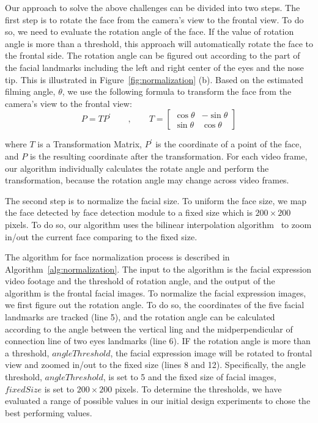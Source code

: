             Our approach to solve the above challenges can be divided into two steps. The first step is to rotate the face from the camera's view to the frontal view. To do so, we need to evaluate the rotation angle of the face. If the value of rotation angle is more than a threshold, this approach will automatically rotate the face to the frontal side. The rotation angle can be figured out according to the part of the facial landmarks including the left and right center of the eyes and the nose tip. This is illustrated in Figure~\ref{fig:normalization} (b). Based on the estimated filming angle, $\theta$, we use the following formula to transform the face from the camera's view to the frontal view:
            \begin{equation}
                P=TP^{'} \qquad, \qquad  T=\left[ \begin{matrix} \cos\theta & -\sin\theta \\ \sin\theta & \cos\theta \end{matrix} \right]
            \end{equation}

            where $T$ is a Transformation Matrix, $P^{'}$ is the coordinate of a point of the face, and $P$ is the resulting coordinate after the transformation. For each video frame, our algorithm individually calculates the rotate angle and perform the transformation, because the rotation angle may change across video frames.

            The second step is to normalize the facial size. To uniform the face size, we map the face detected by face detection module to a fixed size which is $200\times200$ pixels. To do so, our algorithm uses the bilinear interpolation algorithm~\cite{Gribbon2004A} to zoom in/out the current face comparing to the fixed size.

            The algorithm for face normalization process is described in Algorithm~\ref{alg:normalization}. The input to the algorithm is the facial expression video footage and the threshold of rotation angle, and the output of the algorithm is the frontal facial images. To normalize the facial expression images, we first figure out the rotation angle. To do so, the coordinates of the five facial landmarks are tracked (line 5), and the rotation angle can be calculated according to the angle between the vertical ling and the midperpendicular of connection line of two eyes landmarks (line 6). IF the rotation angle is more than a threshold, $angleThreshold$, the facial expression image will be rotated to frontal view and zoomed in/out to the fixed size (lines 8 and 12).  Specifically, the angle threshold, $angleThreshold$, is set to 5 and the fixed size of facial images, $fixedSize$ is set to $200\times200$ pixels. To determine the thresholds, we have evaluated a range of possible values in our initial design experiments to chose the best performing values.

